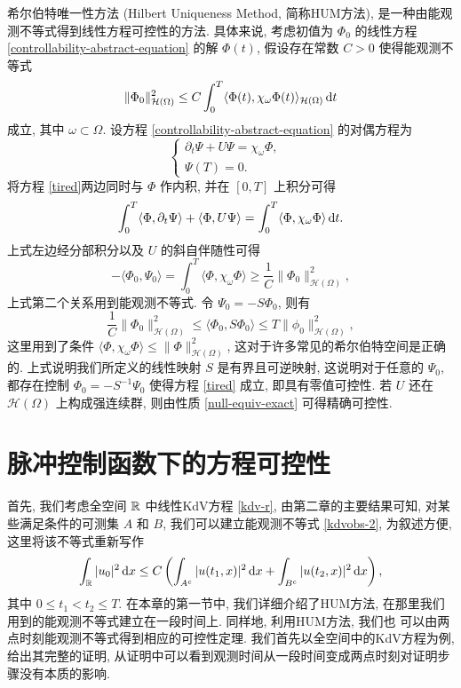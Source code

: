 希尔伯特唯一性方法 (Hilbert Uniqueness Method, 简称HUM方法), 是一种由能观测不等式得到线性方程可控性的方法. 具体来说, 考虑初值为 $\Phi_0$ 的线性方程 \eqref{controllability-abstract-equation}
的解 $\Phi(t)$, 假设存在常数 $C>0$ 使得能观测不等式
\begin{equation}
    \|\Phi_0\|_{\mathcal{H}(\Omega)}^2\le C\int_0^T\langle \Phi(t),\chi_{\omega} \Phi(t)\rangle_{\mathcal{H}(\Omega)}\,\mathrm{d} t 
\end{equation}
成立, 其中 $\omega\subset \Omega$. 设方程 \eqref{controllability-abstract-equation} 的对偶方程为
\begin{equation}
    \left\lbrace
    \begin{array}{ll}
        \partial_t \Psi+U\Psi=\chi_{\omega}\Phi, &  \\
         \Psi(T)=0.& 
    \end{array}
    \right.\label{tired}
\end{equation}
将方程 \eqref{tired}两边同时与 ${\Phi}$ 作内积, 并在 $[0,T]$ 上积分可得
\begin{equation*}
    \int_0^T\langle \Phi,\partial_t \Psi\rangle+\langle \Phi,U\Psi\rangle =\int_0^T\langle \Phi,\chi_{\omega}\Phi\rangle \,\mathrm{d} t.
\end{equation*}
上式左边经分部积分以及 $U$ 的斜自伴随性可得
\begin{equation*}
    -\langle \Phi_0,\Psi_0\rangle=\int_0^T\langle \Phi,\chi_{\omega}\Phi\rangle\ge \frac{1}{C}\|\Phi_0\|^2_{\mathcal{H}(\Omega)},
\end{equation*}
上式第二个关系用到能观测不等式. 令 $\Psi_0=-S\Phi_0$, 则有
\begin{equation}
    \frac{1}{C}\|\Phi_0\|^2_{\mathcal{H}(\Omega)}\le\langle \Phi_0, S\Phi_0\rangle \le T\|\phi_0\|^2_{\mathcal{H}(\Omega)}, 
\end{equation}
这里用到了条件 $\langle \Phi,\chi_{\omega}\Phi\rangle\le \|\Phi\|^2_{\mathcal{H}(\Omega)}$, 这对于许多常见的希尔伯特空间是正确的.
上式说明我们所定义的线性映射 $S$ 是有界且可逆映射, 这说明对于任意的 $\Psi_0$, 都存在控制 $\Phi_0=-S^{-1}\Psi_0$ 使得方程 \eqref{tired} 成立, 即具有零值可控性. 若 $U$ 还在 $\mathcal{H}(\Omega)$ 上构成强连续群, 则由性质 \ref{null-equiv-exact} 可得精确可控性.

\section{脉冲控制函数下的方程可控性}
首先, 我们考虑全空间 $\mathbb{R}$ 中线性KdV方程 \eqref{kdv-r}, 由第二章的主要结果可知, 对某些满足条件的可测集 $A$ 和 $B$, 我们可以建立能观测不等式 \eqref{kdvobs-2}, 为叙述方便, 这里将该不等式重新写作
     \begin{equation}
         \int_{\mathbb{R}} |u_0|^2 \,\mathrm{d} x\le C\left(\int_{A^c}|u(t_1,x)|^2\,\mathrm{d} x+\int_{B^c}|u(t_2,x)|^2\,\mathrm{d} x\right),\label{kdv-r-4}
     \end{equation}
     其中 $0\le t_1<t_2\le T$.
在本章的第一节中, 我们详细介绍了HUM方法, 在那里我们用到的能观测不等式建立在一段时间上. 同样地, 利用HUM方法, 我们也 可以由两点时刻能观测不等式得到相应的可控性定理. 我们首先以全空间中的KdV方程为例, 给出其完整的证明, 从证明中可以看到观测时间从一段时间变成两点时刻对证明步骤没有本质的影响. 

